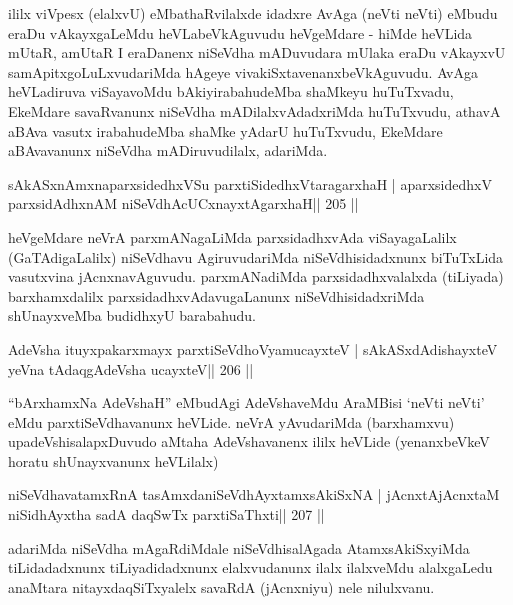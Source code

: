 \begin{artha}
ililx viVpesx (elalxvU) eMbathaRvilalxde idadxre AvAga (neVti neVti)
eMbudu eraDu vAkayxgaLeMdu heVLabeVkAguvudu heVgeMdare - hiMde
heVLida mUtaR, amUtaR I eraDanenx niSeVdha mADuvudara mUlaka eraDu
vAkayxvU samApitxgoLuLxvudariMda hAgeye
vivakiSxtavenanxbeVkAguvudu. AvAga heVLadiruva viSayavoMdu
bAkiyirabahudeMba shaMkeyu huTuTxvadu, EkeMdare savaRvanunx niSeVdha
mADilalxvAdadxriMda huTuTxvudu, athavA aBAva vasutx irabahudeMba
shaMke yAdarU huTuTxvudu, EkeMdare aBAvavanunx
niSeVdha mADiruvudilalx, adariMda.
\end{artha}

\begin{shl}
sAkASxnAmxnaparxsidedhxVSu parxtiSidedhxVtaragarxhaH |
aparxsidedhxV parxsidAdhxnAM niSeVdhAcUCxnayxtAgarxhaH\hfill || 205 ||
\end{shl}

\begin{artha}
heVgeMdare neVrA parxmANagaLiMda parxsidadhxvAda viSayagaLalilx
(GaTAdigaLalilx) niSeVdhavu AgiruvudariMda niSeVdhisidadxnunx
biTuTxLida vasutxvina jAcnxnavAguvudu. parxmANadiMda
parxsidadhxvalalxda (tiLiyada) barxhamxdalilx
parxsidadhxvAdavugaLanunx niSeVdhisidadxriMda shUnayxveMba budidhxyU
barabahudu.
\end{artha}


\begin{shl}
AdeVsha ituyxpakarxmayx parxtiSeVdhoV\s yamucayxteV |
sAkASxdAdishayxteV yeVna tAdaqgAdeVsha ucayxteV\hfill || 206 ||
\end{shl}

\begin{artha}
``bArxhamxNa AdeVshaH'' eMbudAgi AdeVshaveMdu AraMBisi `neVti neVti'
  eMdu parxtiSeVdhavanunx heVLide. neVrA yAvudariMda (barxhamxvu)
  upadeVshisalapxDuvudo aMtaha AdeVshavanenx ililx heVLide (yenanxbeVkeV horatu shUnayxvanunx heVLilalx)
\end{artha}

\begin{shl}
niSeVdhavatamxRnA tasAmxdaniSeVdhAyxtamxsAkiSxNA |
jAcnxtAjAcnxtaM niSidhAyxtha sadA daqSwTx parxtiSaThxti\hfill || 207 ||
\end{shl}

\begin{artha}
adariMda niSeVdha mAgaRdiMdale niSeVdhisalAgada AtamxsAkiSxyiMda tiLidadadxnunx tiLiyadidadxnunx elalxvudanunx ilalx ilalxveMdu alalxgaLedu anaMtara nitayxdaqSiTxyalelx savaRdA (jAcnxniyu) nele nilulxvanu.
\end{artha}

